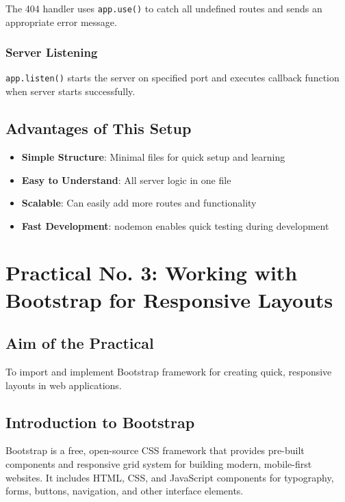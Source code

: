 \documentclass[12pt,a4paper]{article}
\begin{document}
The 404 handler uses \texttt{app.use()} to catch all undefined routes and sends an appropriate error message.

\subsubsection{Server Listening}

\texttt{app.listen()} starts the server on specified port and executes callback function when server starts successfully.

\subsection{Advantages of This Setup}

\begin{itemize}
    \item \textbf{Simple Structure}: Minimal files for quick setup and learning
    \item \textbf{Easy to Understand}: All server logic in one file
    \item \textbf{Scalable}: Can easily add more routes and functionality
    \item \textbf{Fast Development}: nodemon enables quick testing during development
\end{itemize}


\newpage

\section{Practical No. 3: Working with Bootstrap for Responsive Layouts}

\subsection{Aim of the Practical}
To import and implement Bootstrap framework for creating quick, responsive layouts in web applications.

\subsection{Introduction to Bootstrap}
Bootstrap is a free, open-source CSS framework that provides pre-built components and responsive grid system for building modern, mobile-first websites. It includes HTML, CSS, and JavaScript components for typography, forms, buttons, navigation, and other interface elements.
\end{document}
